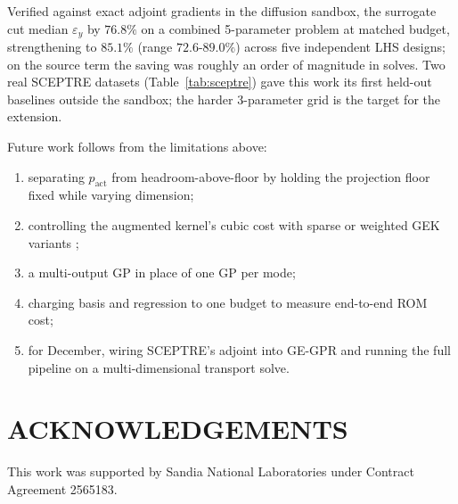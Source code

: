 \documentclass[]{ANStopical}
\begin{document}
Verified against exact adjoint gradients in the diffusion sandbox, the surrogate cut median $\varepsilon_y$ by $76.8\%$ on a combined 5-parameter problem at matched budget, strengthening to $85.1\%$ (range $72.6$-$89.0\%$) across five independent LHS designs; on the source term the saving was roughly an order of magnitude in solves. Two real SCEPTRE datasets (Table~\ref{tab:sceptre}) gave this work its first held-out baselines outside the sandbox; the harder 3-parameter grid is the target for the extension.

Future work follows from the limitations above:
\begin{enumerate}
    \item separating $p_{\mathrm{act}}$ from headroom-above-floor by holding the projection floor fixed while varying dimension;
    \item controlling the augmented kernel's cubic cost with sparse or weighted GEK variants \cite{han_wgek,bouhlel_gek};
    \item a multi-output GP in place of one GP per mode;
    \item charging basis and regression to one budget to measure end-to-end ROM cost;
    \item for December, wiring SCEPTRE's adjoint into GE-GPR and running the full pipeline on a multi-dimensional transport solve.
\end{enumerate}

\section*{ACKNOWLEDGEMENTS}
This work was supported by Sandia National Laboratories under Contract Agreement 2565183.




\end{document}
